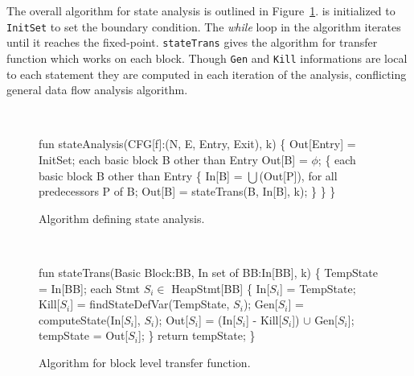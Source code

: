 The overall algorithm for state analysis is outlined in Figure~\ref{fig:AlgoStateAnal}. 
 is initialized to {\tt InitSet} to set the boundary condition. 
The \emph{while} loop in the algorithm iterates until it reaches the fixed-point. 
{\tt stateTrans} gives the algorithm for transfer function which works on each block. 
Though {\tt Gen} and {\tt Kill} informations are local to each statement they are 
computed in each iteration of the analysis, conflicting general data flow analysis algorithm. 
 
\begin{figure}
\begin{framed}
{\tt
  \begin{program}{0}
  \FL fun stateAnalysis(CFG[f]:(N, E, Entry, Exit), k)  \{
   Out[Entry] = InitSet; 
   \FOR each basic block B other than Entry
   
   Out[B] = $\phi$; 
    \{ 
   \FOR each basic block B other than Entry \{
   In[B] = $\bigcup$(Out[P]), for all predecessors P of B;
   Out[B] = stateTrans(B, In[B], k);
   \}
   \}
   \}
  \end{program}
}
\end{framed}
  \caption{Algorithm defining state analysis. \label{fig:AlgoStateAnal}}
\end{figure}
\begin{figure}
\begin{framed}
{\tt
  \begin{program}{0}
  \FL fun stateTrans(Basic Block:BB, In set of BB:In[BB], k)  \{
   TempState = In[BB];
   \FOR each Stmt $S_i\in$ HeapStmt[BB] \{ 
   
   In[$S_i$] = TempState;
   Kill[$S_i$] = findStateDefVar(TempState, $S_i$);
   Gen[$S_i$] = computeState(In[$S_i$], $S_i$);
   Out[$S_i$] = (In[$S_i$] - Kill[$S_i$]) $\cup$ Gen[$S_i$];
   tempState = Out[$S_i$];
   \}
   return tempState;
   \}
  \end{program}
}
\end{framed}
  \caption{Algorithm for block level transfer function. \label{fig:AlgoGenState}}
\end{figure}
